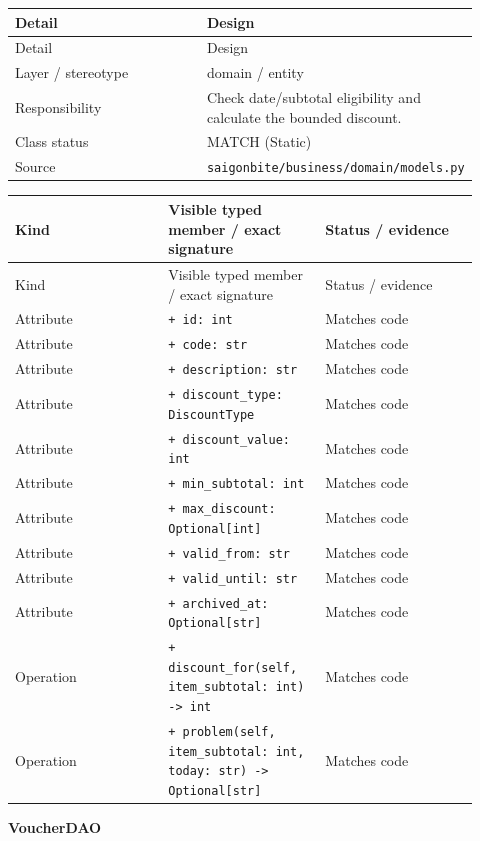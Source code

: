 \begin{longtable}{>{\raggedright\arraybackslash}p{0.4600\linewidth}>{\raggedright\arraybackslash}p{0.4600\linewidth}}
Detail & Design \\
\hline\endfirsthead
Detail & Design \\
\hline\endhead
Layer / stereotype & domain / \guillemotleft{}entity\guillemotright{} \\
Responsibility & Check date/subtotal eligibility and calculate the bounded discount. \\
Class status & MATCH (Static) \\
Source & \texttt{saigonbite/\allowbreak{}business/\allowbreak{}domain/\allowbreak{}models.\allowbreak{}py} \\
\end{longtable}
\begin{longtable}{>{\raggedright\arraybackslash}p{0.3067\linewidth}>{\raggedright\arraybackslash}p{0.3067\linewidth}>{\raggedright\arraybackslash}p{0.3067\linewidth}}
Kind & Visible typed member / exact signature & Status / evidence \\
\hline\endfirsthead
Kind & Visible typed member / exact signature & Status / evidence \\
\hline\endhead
Attribute & \texttt{+ id: int} & Matches code \\
Attribute & \texttt{+ code: str} & Matches code \\
Attribute & \texttt{+ description: str} & Matches code \\
Attribute & \texttt{+ discount\_\allowbreak{}type: DiscountType} & Matches code \\
Attribute & \texttt{+ discount\_\allowbreak{}value: int} & Matches code \\
Attribute & \texttt{+ min\_\allowbreak{}subtotal: int} & Matches code \\
Attribute & \texttt{+ max\_\allowbreak{}discount: Optional[int]} & Matches code \\
Attribute & \texttt{+ valid\_\allowbreak{}from: str} & Matches code \\
Attribute & \texttt{+ valid\_\allowbreak{}until: str} & Matches code \\
Attribute & \texttt{+ archived\_\allowbreak{}at: Optional[str]} & Matches code \\
Operation & \texttt{+ discount\_\allowbreak{}for(self, item\_\allowbreak{}subtotal: int) -\textgreater{} int} & Matches code \\
Operation & \texttt{+ problem(self, item\_\allowbreak{}subtotal: int, today: str) -\textgreater{} Optional[str]} & Matches code \\
\end{longtable}
\textbf{VoucherDAO}

